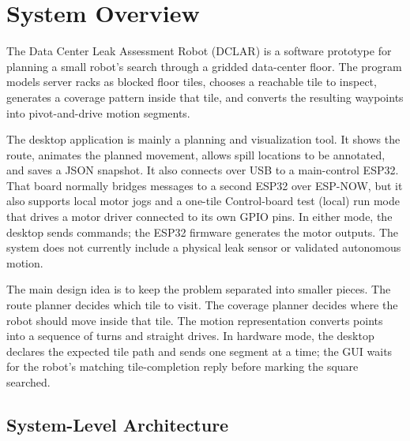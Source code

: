 \documentclass{article}
\begin{document}
\section{System Overview}

The Data Center Leak Assessment Robot (DCLAR) is a software prototype for planning a small robot's search through a gridded data-center floor. The program models server racks as blocked floor tiles, chooses a reachable tile to inspect, generates a coverage pattern inside that tile, and converts the resulting waypoints into pivot-and-drive motion segments.

The desktop application is mainly a planning and visualization tool. It shows the route, animates the planned movement, allows spill locations to be annotated, and saves a JSON snapshot. It also connects over USB to a main-control ESP32. That board normally bridges messages to a second ESP32 over ESP-NOW, but it also supports local motor jogs and a one-tile Control-board test (local) run mode that drives a motor driver connected to its own GPIO pins. In either mode, the desktop sends commands; the ESP32 firmware generates the motor outputs. The system does not currently include a physical leak sensor or validated autonomous motion.

The main design idea is to keep the problem separated into smaller pieces. The route planner decides which tile to visit. The coverage planner decides where the robot should move inside that tile. The motion representation converts points into a sequence of turns and straight drives. In hardware mode, the desktop declares the expected tile path and sends one segment at a time; the GUI waits for the robot's matching tile-completion reply before marking the square searched.

\subsection{System-Level Architecture}
\end{document}
